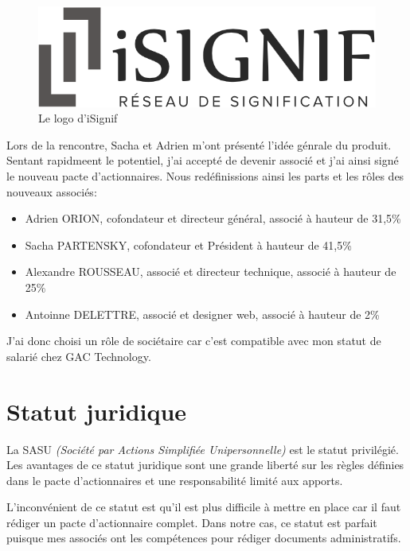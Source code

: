 \documentclass[]{report}
\begin{document}
    \begin{figure}
      \includegraphics[width=\linewidth]{img/logo.png}
      \caption{Le logo d'iSignif}
    \end{figure}

    Lors de la rencontre, Sacha et Adrien m'ont présenté l'idée génrale du produit. Sentant rapidmeent le potentiel, j'ai accepté de devenir associé et j'ai ainsi signé le nouveau pacte d'actionnaires. Nous redéfinissions ainsi les parts et les rôles des nouveaux associés:

    \begin{itemize}
      \item Adrien ORION, cofondateur et directeur général, associé à hauteur de 31,5\%
      \item Sacha PARTENSKY, cofondateur et Président à hauteur de 41,5\%
      \item Alexandre ROUSSEAU, associé et directeur technique, associé à hauteur de 25\%
      \item Antoinne DELETTRE, associé et designer web, associé à hauteur de 2\%
    \end{itemize}

    J'ai donc choisi un rôle de sociétaire car c'est compatible avec mon statut de salarié chez GAC Technology.

  \section{Statut juridique}\label{sec:sas}


    La SASU \textit{(Société par Actions Simplifiée Unipersonnelle)} est le statut privilégié. Les avantages de ce statut juridique sont une grande liberté sur les règles définies dans le pacte d'actionnaires et une responsabilité limité aux apports.

    L'inconvénient de ce statut est qu'il est plus difficile à mettre en place car il faut rédiger un pacte d'actionnaire complet. Dans notre cas, ce statut est parfait puisque mes associés ont les compétences pour rédiger documents administratifs.
\end{document}
